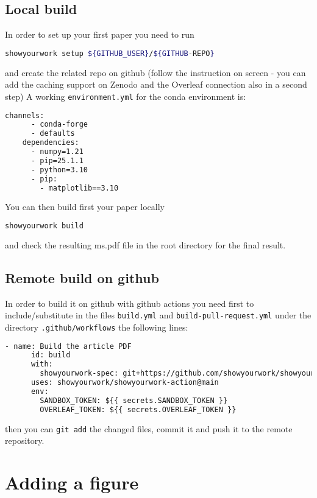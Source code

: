 \documentclass{aa}
\begin{document}
\subsection{Local build}
In order to set up your first paper you need to run
  \begin{lstlisting}[language=bash]
    showyourwork setup ${GITHUB_USER}/${GITHUB-REPO}
  \end{lstlisting}
and create the related repo on github (follow the instruction on screen - you can add the caching support on Zenodo and the Overleaf connection also in a second step)
A working \texttt{environment.yml} for the conda environment is:
  \begin{lstlisting}[language=bash]
    channels:
      - conda-forge
      - defaults
    dependencies:
      - numpy=1.21
      - pip=25.1.1
      - python=3.10
      - pip:
        - matplotlib==3.10
  \end{lstlisting}
You can then build first your paper locally
  \begin{lstlisting}[language=bash]
    showyourwork build
  \end{lstlisting} 
and check the resulting ms.pdf file in the root directory for the final result.

\subsection{Remote build on github}
In order to build it on github with github actions you need first to include/substitute in the files \texttt{build.yml} and \texttt{build-pull-request.yml} under the directory \texttt{.github/workflows} the following lines:
  \begin{lstlisting}[language=xml]
    - name: Build the article PDF
      id: build
      with:
        showyourwork-spec: git+https://github.com/showyourwork/showyourwork
      uses: showyourwork/showyourwork-action@main
      env:
        SANDBOX_TOKEN: ${{ secrets.SANDBOX_TOKEN }}
        OVERLEAF_TOKEN: ${{ secrets.OVERLEAF_TOKEN }}
  \end{lstlisting}
then you can \texttt{git add} the changed files, commit it and push it to the remote repository.

\section{Adding a figure}
\end{document}
